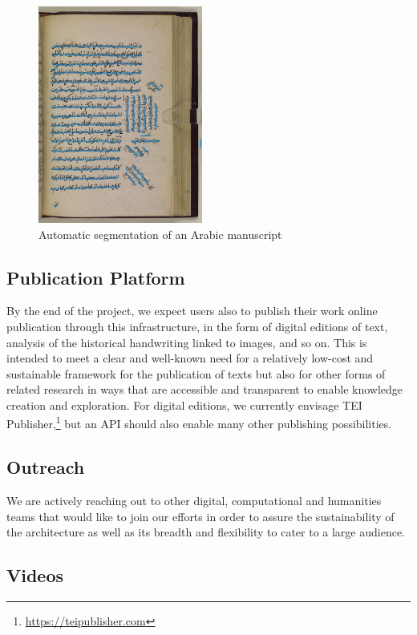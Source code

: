 \begin{figure}
	\includegraphics[width=0.48\textwidth]{arabic.jpg}
	\caption{Automatic segmentation of an Arabic manuscript}
	\label{fig_ost:arabic}
\end{figure}

\subsection{Publication Platform}

By the end of the project, we expect users also to publish their work online
publication through this infrastructure, in the form of digital editions of
text, analysis of the historical handwriting linked to images, and so on. This
is intended to meet a clear and well-known need for a relatively low-cost and
sustainable framework for the publication of texts but also for other forms of
related research in ways that are accessible and transparent to enable
knowledge creation and exploration. For digital editions, we currently envisage
TEI Publisher,\footnote{\url{https://teipublisher.com}} but an API should also
enable many other publishing possibilities.

\subsection{Outreach}

We are actively reaching out to other digital, computational and humanities
teams that would like to join our efforts in order to assure the sustainability
of the architecture as well as its breadth and flexibility to cater to a large
audience.

\subsection{Videos}

